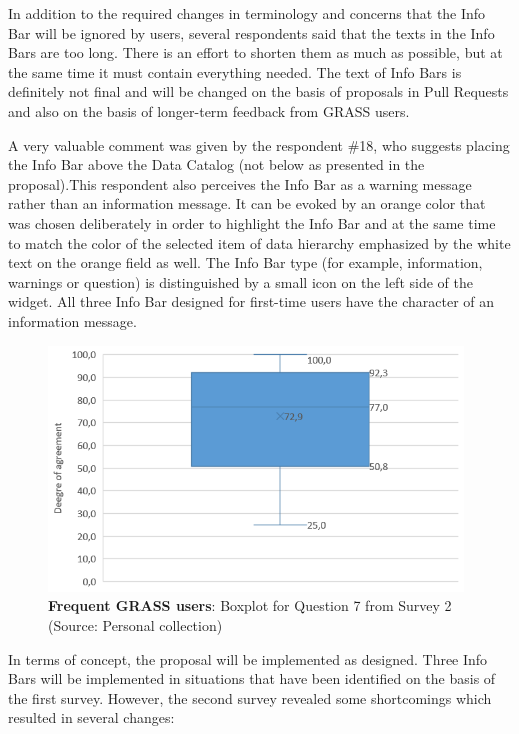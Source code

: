 \documentclass[a4paper,10pt,twoside]{article}
\begin{document}
\noindent In addition to the required changes in terminology and concerns that the Info Bar will be ignored by users, several respondents said that the texts in the Info Bars are too long. There is an effort to shorten them as much as possible, but at the same time it must contain everything needed. The text of Info Bars is definitely not final and will be changed on the basis of proposals in Pull Requests and also on the basis of longer-term feedback from GRASS users.

A very valuable comment was given by the respondent \#18, who suggests placing the Info Bar above the Data Catalog (not below as presented in the proposal).This respondent also perceives the Info Bar as a warning message rather than an information message. It can be evoked by an orange color that was chosen deliberately in order to highlight the Info Bar and at the same time to match the color of the selected item of data hierarchy emphasized by the white text on the orange field as well. The Info Bar type (for example, information, warnings or question) is distinguished by a small icon on the left side of the widget. All three Info Bar designed for first-time users have the character of an information message.

\vspace{0.3cm}
\begin{figure}[hbt!] 
\begin{center}
\includegraphics[width=11cm]{../surveys/analyzed_data/survey2_question7_boxplot_group2.png} 
\caption[\textbf{Frequent GRASS users}: Boxplot for Question 7 from Survey 2]{\textbf{Frequent GRASS users}: Boxplot for Question 7 from Survey 2 (Source: Personal collection)}
\label{fig:survey2_question7_boxplot_group2}
\end{center}
\end{figure}

\noindent In terms of concept, the proposal will be implemented as designed. Three Info Bars will be implemented in situations that have been identified on the basis of the first survey. However, the second survey revealed some shortcomings which resulted in several changes:
\end{document}
